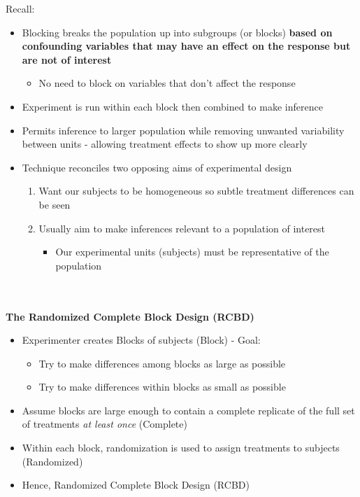 Recall:
 \begin{itemize}
  \item{Blocking breaks the population up into subgroups (or blocks) \textbf{based on confounding variables that may have an effect on the response but are not of interest}}
        \begin{itemize}
            \item{No need to block on variables that don't affect the response}
        \end{itemize}
        \item{Experiment is run within each block then combined to make inference}
        \item{Permits inference to larger population while removing unwanted variability between units - allowing treatment effects to show up more clearly}
        \item{Technique reconciles two opposing aims of experimental design}
    \begin{enumerate}
        \item{Want our subjects to be homogeneous so subtle treatment differences can be seen}
        \item{Usually aim to make inferences relevant to a population of interest}
        \begin{itemize}
            \item{Our experimental units (subjects) must be representative of the population}
        \end{itemize}
    \end{enumerate}
\end{itemize}		

~\\~\\
\textbf{The Randomized Complete Block Design (RCBD)}
    \begin{itemize}
        \item{Experimenter creates Blocks of subjects (Block) - Goal:}
        \begin{itemize}
            \item{Try to make differences among blocks as large as possible}
            \item{Try to make differences within blocks as small as possible}
        \end{itemize}
        \item{Assume blocks are large enough to contain a complete replicate of the full set of treatments \textit{at least once} (Complete)}
        \item{Within each block, randomization is used to assign treatments to subjects (Randomized)}
        \item{Hence, Randomized Complete Block Design (RCBD)}
    \end{itemize}

